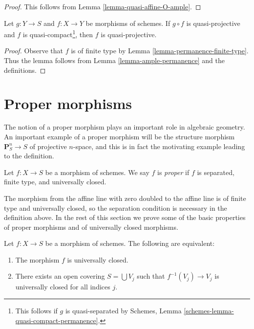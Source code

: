 \begin{proof}
This follows from Lemma \ref{lemma-quasi-affine-O-ample}.
\end{proof}

\begin{lemma}
\label{lemma-quasi-projective-permanence}
Let $g : Y \to S$ and $f : X \to Y$ be morphisms of schemes.
If $g \circ f$ is quasi-projective and $f$ is
quasi-compact\footnote{This follows if $g$ is quasi-separated by
Schemes, Lemma \ref{schemes-lemma-quasi-compact-permanence}.},
then $f$ is quasi-projective.
\end{lemma}

\begin{proof}
Observe that $f$ is of finite type by
Lemma \ref{lemma-permanence-finite-type}.
Thus the lemma follows from Lemma \ref{lemma-ample-permanence}
and the definitions.
\end{proof}





\section{Proper morphisms}
\label{section-proper}

\noindent
The notion of a proper morphism plays an important role in algebraic
geometry. An important example of a proper morphism will be the
structure morphism $\mathbf{P}^n_S \to S$ of projective $n$-space,
and this is in fact the motivating example leading to the definition.

\begin{definition}
\label{definition-proper}
Let $f : X \to S$ be a morphism of schemes.
We say $f$ is {\it proper} if $f$ is separated, finite type, and
universally closed.
\end{definition}

\noindent
The morphism from the affine line with zero doubled to the affine line
is of finite type and universally closed, so the separation condition is
necessary in the definition above.
In the rest of this section we prove some of the basic properties
of proper morphisms and of universally closed morphisms.

\begin{lemma}
\label{lemma-universally-closed-local-on-the-base}
Let $f : X \to S$ be a morphism of schemes.
The following are equivalent:
\begin{enumerate}
\item The morphism $f$ is universally closed.
\item There exists an open covering $S = \bigcup V_j$ such
that $f^{-1}(V_j) \to V_j$ is universally closed for all indices $j$.
\end{enumerate}
\end{lemma}

